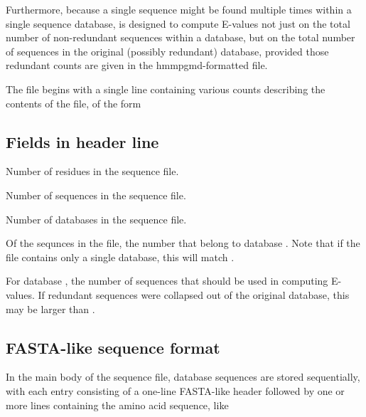 Furthermore, because a single sequence might be found multiple times
within a single sequence database,  is designed to compute
E-values not just on the total number of non-redundant sequences
within a database, but on the total number of sequences in the original
(possibly redundant) database, provided those redundant counts are
given in the hmmpgmd-formatted file.

The  file begins with a single line containing various counts
describing the contents of the file, of the form


\subsection{Fields in header line}

\begin{sreitems}{}

\item [\monob{res\_cnt}] Number of residues in the sequence file.

\item [\monob{seq\_cnt}] Number of sequences in the sequence file. 

\item [\monob{db\_cnt}] Number of databases in the sequence file. 

\item [\monob{cnt\_i}] Of the sequnces in the file, the number that belong to
database . Note that if the file contains only a single
database, this will match .
 
\item [\monob{fullcnt\_i}] For database , the number of sequences
that should be used in computing E-values. If redundant 
sequences were collapsed out of the original database, this may be 
larger than .  

\end{sreitems}


\subsection{FASTA-like sequence format}

In the main body of the sequence file, database sequences are stored
sequentially, with each entry consisting of a one-line FASTA-like
header followed by one or more lines containing the amino acid sequence, 
like

